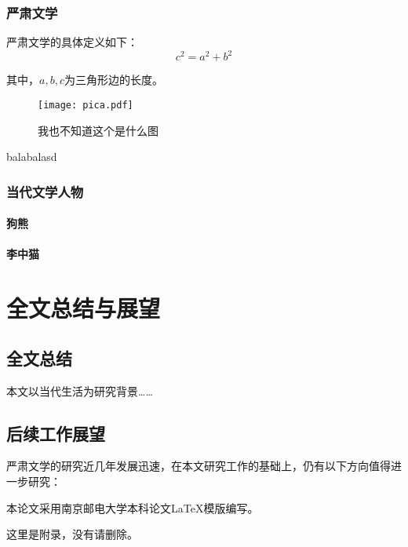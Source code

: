 \documentclass[bachelor,nofonts]{njupthesis}
\begin{document}
\subsection{严肃文学}
严肃文学的具体定义如下：
\begin{equation}
c^2 = a^2 + b^2
\end{equation}

其中，$a, b, c$为三角形边的长度。

\begin{figure}[h]
\texttt{[image: pica.pdf]}
\caption{我也不知道这个是什么图}
\label{pica}
\end{figure}
balabalasd



\subsection{当代文学人物}

\subsubsection{狗熊}

\subsubsection{李中猫}


\chapter{全文总结与展望}

\section{全文总结}
本文以当代生活为研究背景……

\section{后续工作展望}
严肃文学的研究近几年发展迅速，在本文研究工作的基础上，仍有以下方向值得进一步研究：

\thesisacknowledgement
本论文采用南京邮电大学本科论文\LaTeX 模版编写。



%
% 
%
% 
% 
%

\thesisappendix
这里是附录，没有请删除。
\end{document}
